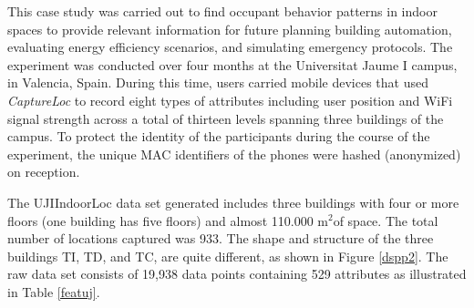 




This case study was carried out to find occupant  behavior patterns  in  indoor  spaces  to provide  relevant  information  for  future planning  building  automation, evaluating energy efficiency scenarios, and simulating   emergency   protocols. The experiment was conducted over four months at the Universitat Jaume I campus, in Valencia, Spain. During this time, users carried mobile devices that used \textit{CaptureLoc} to record eight types of attributes including user position and WiFi signal strength across a total of thirteen levels spanning three buildings of the campus. To protect the identity of the participants during the course of the experiment, the unique MAC identifiers of the phones were hashed (anonymized) on reception.



The UJIIndoorLoc data set generated includes three buildings with four or more floors (one building has five floors) and almost 110.000 m$^{2}$of space. The total number of locations captured was 933. The shape and structure of the three buildings TI, TD, and TC, are quite different, as shown in Figure \ref{dspp2}. The raw data set consists of 19,938 data points containing 529 attributes as illustrated in Table \ref{featuj}. %


